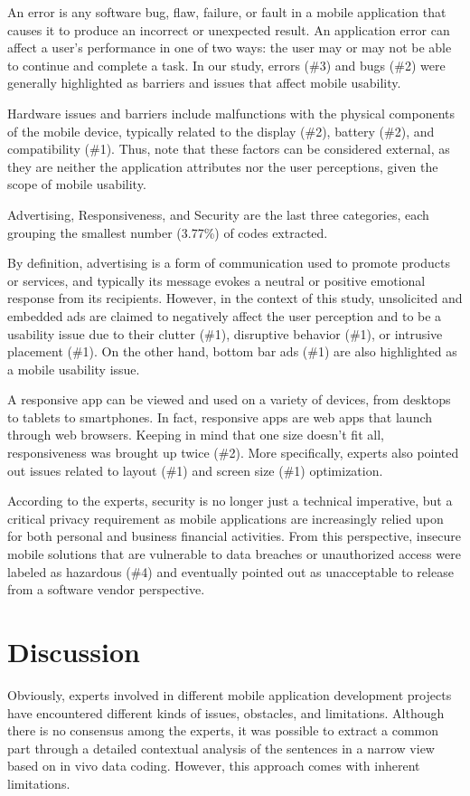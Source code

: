 \documentclass[preprint,12pt,number]{elsarticle}
\begin{document}
An error is any software bug, flaw, failure, or fault in a mobile application that causes it to produce an incorrect or unexpected result. An application error can affect a user's performance in one of two ways: the user may or may not be able to continue and complete a task. In our study, errors (\#3) and bugs (\#2) were generally highlighted as barriers and issues that affect mobile usability.

Hardware issues and barriers include malfunctions with the physical components of the mobile device, typically related to the display (\#2), battery (\#2), and compatibility (\#1). Thus, note that these factors can be considered external, as they are neither the application attributes nor the user perceptions, given the scope of mobile usability. 

Advertising, Responsiveness, and Security are the last three categories, each grouping the smallest number (3.77\%) of codes extracted. 

By definition, advertising is a form of communication used to promote products or services, and typically its message evokes a neutral or positive emotional response from its recipients. However, in the context of this study, unsolicited and embedded ads are claimed to negatively affect the user perception and to be a usability issue due to their clutter (\#1), disruptive behavior (\#1), or intrusive placement (\#1). On the other hand, bottom bar ads (\#1) are also highlighted as a mobile usability issue.

A responsive app can be viewed and used on a variety of devices, from desktops to tablets to smartphones. In fact, responsive apps are web apps that launch through web browsers. Keeping in mind that one size doesn't fit all, responsiveness was brought up twice (\#2). More specifically, experts also pointed out issues related to layout (\#1) and screen size (\#1) optimization.

According to the experts, security is no longer just a technical imperative, but a critical privacy requirement as mobile applications are increasingly relied upon for both personal and business financial activities. From this perspective, insecure mobile solutions that are vulnerable to data breaches or unauthorized access were labeled as hazardous (\#4) and eventually pointed out as unacceptable to release from a software vendor perspective.

\section{Discussion}
\label{sec:discussion}
Obviously, experts involved in different mobile application development projects have encountered different kinds of issues, obstacles, and limitations. Although there is no consensus among the experts, it was possible to extract a common part through a detailed contextual analysis of the sentences in a narrow view based on in vivo data coding. 
However, this approach comes with inherent limitations. 
\end{document}
